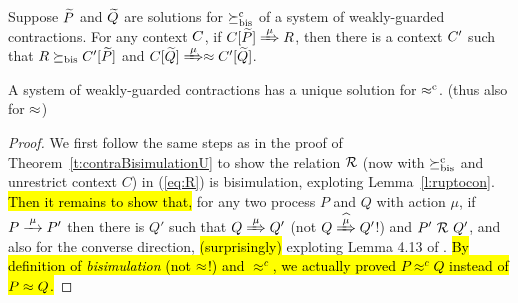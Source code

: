 \begin{lemma}
\label{l:ruptocon}
Suppose $\widetilde P$ and $\widetilde Q$ are solutions  for $\mathrel{\succeq^{\rm{c}}_{\rm{bis}}}$ 
 of a system of weakly-guarded
contractions.
For any context $C$, 
if  $\ct{\til P}\Arr{\mu}  R$,
 then 
there is a  context $C'$
such that $R \mathrel{\succeq_{\rm{bis}}} C' [\widetilde P]$ and  $\ct{\til Q} \Arr{\mu}
 \wb \ctp{\til Q}$.
\end{lemma}

\begin{theorem}
\label{t:rcontraBisimulationU}
A system of weakly-guarded contractions has a unique solution 
 for $\mathrel{\approx^{\rm{c}}}$. (thus also for $\approx$)
\end{theorem} 

\begin{proof}
We first follow the same steps as in the proof of Theorem~\ref{t:contraBisimulationU} to show the relation ${\cal R}$ (now
with $\mathrel{\succeq^{\rm{c}}_{\rm{bis}}}$ and unrestrict context $C$) in (\ref{eq:R}) is bisimulation,
exploting Lemma~\ref{l:ruptocon}. \hl{Then it remains to show that,} for
any two process $P$ and $Q$ with action $\mu$, if $P \arr{\mu} P'$ then
there is $Q'$ such that $Q \Arr{\mu} Q'$ (not $Q \Arcap{\mu} Q'$!) and
$P'\ {\cal R}\ Q'$, and also for the converse direction, 
\hl{(surprisingly)}
exploting Lemma
4.13 of \cite{Mil89}. \hl{By definition of
\emph{bisimulation} (not $\approx$!) and $\approx^c$, we actually proved $P
\approx^c Q$ instead of $P \approx Q$.}
\end{proof}
